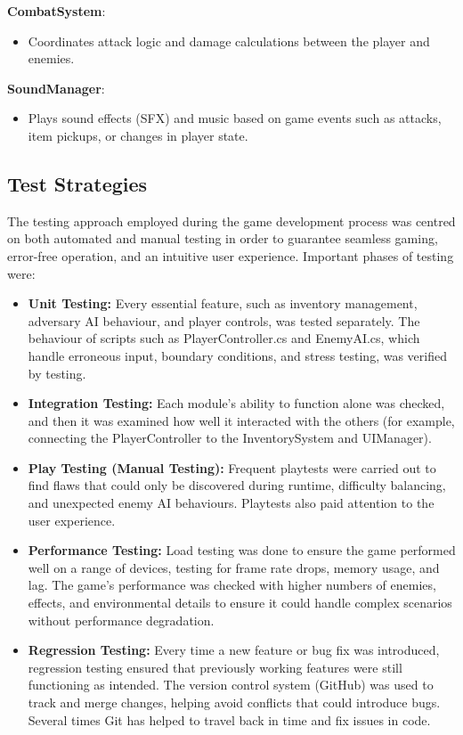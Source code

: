 \textbf{CombatSystem}:
\begin{itemize}
	\item Coordinates attack logic and damage calculations between the player and enemies.
\end{itemize}

\textbf{SoundManager}:
\begin{itemize}
	\item Plays sound effects (SFX) and music based on game events such as attacks, item pickups, or changes in player state.
	\end{itemize}
	

\subsection{Test Strategies}
The testing approach employed during the game development process was centred on both automated and manual testing in order to guarantee seamless gaming, error-free operation, and an intuitive user experience. Important phases of testing were:

\begin{itemize}
	\item \textbf{Unit Testing:}
	Every essential feature, such as inventory management, adversary AI behaviour, and player controls, was tested separately.
	The behaviour of scripts such as PlayerController.cs and EnemyAI.cs, which handle erroneous input, boundary conditions, and stress testing, was verified by testing.
	\item \textbf{Integration Testing:}
	Each module's ability to function alone was checked, and then it was examined how well it interacted with the others (for example, connecting the PlayerController to the InventorySystem and UIManager).
	\item \textbf{Play Testing (Manual Testing):}
	Frequent playtests were carried out to find flaws that could only be discovered during runtime, difficulty balancing, and unexpected enemy AI behaviours.
	Playtests also paid attention to the user experience.
	\item \textbf{Performance Testing:}
	Load testing was done to ensure the game performed well on a range of devices, testing for frame rate drops, memory usage, and lag.
	The game’s performance was checked with higher numbers of enemies, effects, and environmental details to ensure it could handle complex scenarios without performance degradation.
	\item \textbf{Regression Testing:}
	Every time a new feature or bug fix was introduced, regression testing ensured that previously working features were still functioning as intended.
	The version control system (GitHub) was used to track and merge changes, helping avoid conflicts that could introduce bugs. Several times Git has helped to travel back in time and fix issues in code.
\end{itemize}


